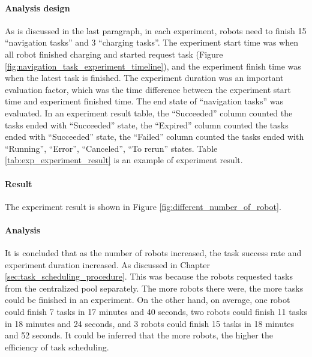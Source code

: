 \paragraph{Analysis design}
As is discussed in the last paragraph, in each experiment, robots need to finish 15 ``navigation tasks'' and 3 ``charging tasks''.
The experiment start time was when all robot finished charging and started request task (Figure \ref{fig:navigation_task_experiment_timeline}), and the experiment finish time was when the latest task is finished.
The experiment duration was an important evaluation factor, which was the time difference between the experiment start time and experiment finished time. 
The end state of ``navigation tasks'' was evaluated. In an experiment result table, the ``Succeeded'' column counted the tasks ended with ``Succeeded'' state, the ``Expired'' column counted the tasks ended with ``Succeeded'' state, the ``Failed'' column counted the tasks ended with ``Running'', ``Error'', ``Canceled'', ``To rerun'' states. 
Table \ref{tab:exp_experiment_result} is an example of experiment result. 

\paragraph{Result} The experiment result is shown in Figure \ref{fig:different_number_of_robot}.

\paragraph{Analysis} It is concluded that as the number of robots increased, the task success rate and experiment duration increased. As discussed in Chapter \ref{sec:task_scheduling_procedure}. This was because the robots requested tasks from the centralized pool separately. The more robots there were, the more tasks could be finished in an experiment. 
On the other hand, on average, one robot could finish 7 tasks in 17 minutes and 40 seconds, two robots could finish 11 tasks in 18 minutes and 24 seconds, and 3 robots could finish 15 tasks in 18 minutes and 52 seconds. It could be inferred that the more robots, the higher the efficiency of task scheduling.

